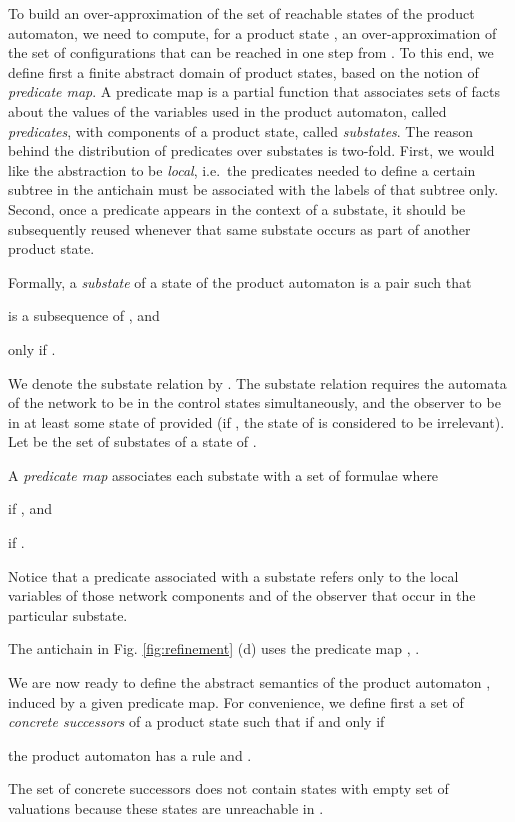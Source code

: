 \documentclass{llncs}
\begin{document}
To build an over-approximation of the set of reachable states of the product
automaton, we need to compute, for a product state , an over-approximation of
the set of configurations that can be reached in one step from . To this end,
we define first a finite abstract domain of product states, based on the notion
of \emph{predicate map}. A predicate map is a partial function that associates
sets of facts about the values of the variables used in the product automaton,
called \emph{predicates}, with components of a product state, called
\emph{substates}. The reason behind the distribution of predicates over
substates is two-fold. First, we would like the abstraction to be \emph{local},
i.e.\ the predicates needed to define a certain subtree in the antichain must be
associated with the labels of that subtree only. Second, once a predicate
appears in the context of a substate, it should be subsequently reused whenever
that same substate occurs as part of another product state.

Formally, a \emph{substate} of a state  of the product automaton  is a
pair  such
that \begin{inparaenum}[(i)]
\item  is a subsequence of
  , and
\item  only if . 
\end{inparaenum}
We denote the substate relation by . The substate relation
requires the automata  of the network
 to be in the control states 
simultaneously, and the observer  to be in at least some state of
 provided  (if , the state of  is
considered to be irrelevant). Let  be the set
of substates of a state of .

A \emph{predicate map}  associates each substate  with a set of
formulae  where \begin{inparaenum}[(i)]
\item  if , and
\item  if .
\end{inparaenum}
Notice that a predicate associated with a substate refers only to the
local variables of those network components  and of the observer  that occur in the particular
substate.

\begin{example}\label{ex:predicate-map} 
The antichain in Fig. \ref{fig:refinement} (d) uses the predicate map
,
. 
\end{example}

We are now ready to define the abstract semantics of the product
automaton , induced by a given
predicate map. For convenience, we define first a set
 of \emph{concrete successors} of a product state
 such that  if and
only if\begin{inparaenum}[(i)]
\item the product automaton  has a
  rule  and
.
\end{inparaenum}
The set of concrete successors does not contain states with empty set
of valuations because these states are unreachable in .
\end{document}
